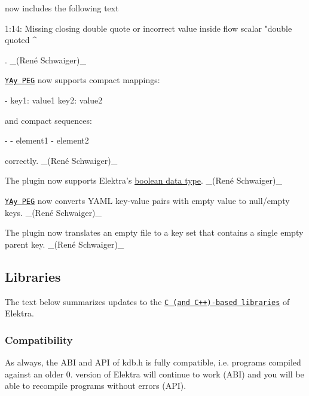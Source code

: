 now includes the following text


\begin{DoxyCode}
1:14: Missing closing double quote or incorrect value inside flow scalar
      "double quoted
                    ^
\end{DoxyCode}


. \+\_\+(René Schwaiger)\+\_\+


\begin{DoxyItemize}
\item \href{https://www.libelektra.org/plugins/yaypeg}{\tt Y\+Ay P\+EG} now supports compact mappings\+:
\end{DoxyItemize}


\begin{DoxyCode}
- key1: value1
  key2: value2
\end{DoxyCode}


and compact sequences\+:


\begin{DoxyCode}
- - element1
  - element2
\end{DoxyCode}


correctly. \+\_\+(René Schwaiger)\+\_\+


\begin{DoxyItemize}
\item The plugin now supports Elektra’s \hyperlink{doc_decisions_bool_md}{boolean data type}. \+\_\+(René Schwaiger)\+\_\+
\item \href{https://www.libelektra.org/plugins/yaypeg}{\tt Y\+Ay P\+EG} now converts Y\+A\+ML key-\/value pairs with empty value to null/empty keys. \+\_\+(René Schwaiger)\+\_\+
\item The plugin now translates an empty file to a key set that contains a single empty parent key. \+\_\+(René Schwaiger)\+\_\+
\end{DoxyItemize}

\subsection*{Libraries}

The text below summarizes updates to the \href{https://www.libelektra.org/libraries/readme}{\tt C (and C++)-\/based libraries} of Elektra.

\subsubsection*{Compatibility}

As always, the A\+BI and A\+PI of kdb.\+h is fully compatible, i.\+e. programs compiled against an older 0. version of Elektra will continue to work (A\+BI) and you will be able to recompile programs without errors (A\+PI).


